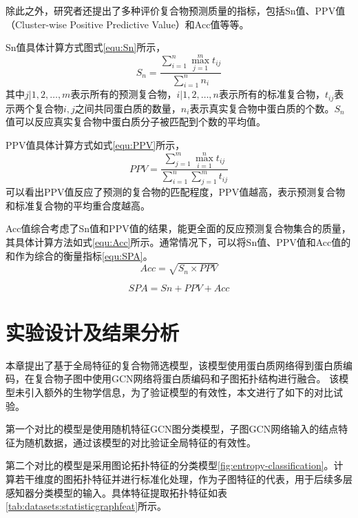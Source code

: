{除此之外，研究者还提出了多种评价复合物预测质量的指标\cite{shi_protein_2011}，包括Sn值、PPV值（Cluster-wise Positive Predictive Value）和Acc值等等。

Sn值具体计算方式图式\ref{equ:Sn}所示，
\begin{equation}
    \label{equ:Sn}
    S_n=\frac{\sum_{i = 1}^{n} \max_{j=1}^{m} t_{ij}}{\sum_{i = 1}^{n}n_i}
\end{equation}
其中${j| 1,2,\dots,m }$表示所有的预测复合物，${i| 1,2,\dots,n }$表示所有的标准复合物，$t_{ij}$表示两个复合物$i,j$之间共同蛋白质的数量，$n_i$表示真实复合物中蛋白质的个数。$S_n$值可以反应真实复合物中蛋白质分子被匹配到个数的平均值。

PPV值具体计算方式如式\ref{equ:PPV}所示，
\begin{equation}
    \label{equ:PPV}
    PPV=\frac{\sum_{j = 1}^{m} \max_{i=1}^{n} t_{ij}}{\sum_{i = 1}^{n} \sum_{j = 1}^{m}   t_{ij}}
\end{equation}
可以看出PPV值反应了预测的复合物的匹配程度，PPV值越高，表示预测复合物和标准复合物的平均重合度越高。

Acc值综合考虑了Sn值和PPV值的结果，能更全面的反应预测复合物集合的质量，其具体计算方法如式\ref{equ:Acc}所示。通常情况下，可以将Sn值、PPV值和Acc值的和作为综合的衡量指标\ref{equ:SPA}。
\begin{equation}
    \label{equ:Acc}
    Acc=\sqrt{S_n\times PPV}
\end{equation}

\begin{equation}
    \label{equ:SPA}
    SPA= Sn+PPV+Acc
\end{equation}

\section{实验设计及结果分析}
\label{section:NodeConv:experience}

本章提出了基于全局特征的复合物筛选模型，该模型使用蛋白质网络得到蛋白质编码，在复合物子图中使用GCN网络将蛋白质编码和子图拓扑结构进行融合。
该模型未引入额外的生物学信息，为了验证模型的有效性，本文进行了如下的对比试验。

第一个对比的模型是使用随机特征GCN图分类模型，子图GCN网络输入的结点特征为随机数据，通过该模型的对比验证全局特征的有效性。

第二个对比的模型是采用图论拓扑特征的分类模型\ref{fig:entropy-classification}。计算若干维度的图拓扑特征并进行标准化处理，作为子图特征的代表，用于后续多层感知器分类模型的输入。具体特征提取拓扑特征如表\ref{tab:datasets:statisticgraphfeat}所示。

}
